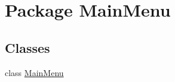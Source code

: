 \hypertarget{namespace_main_menu}{\section{Package Main\-Menu}
\label{d3/dde/namespace_main_menu}
}
\subsection*{Classes}
\begin{DoxyCompactItemize}
\item 
class \hyperlink{class_main_menu_1_1_main_menu}{Main\-Menu}
\end{DoxyCompactItemize}
